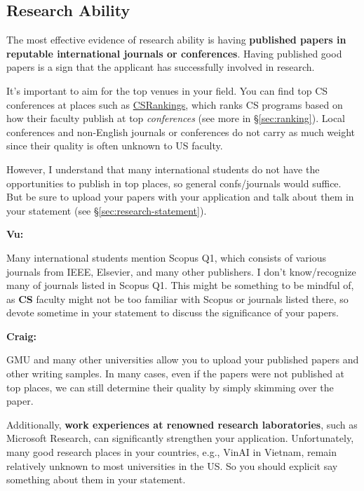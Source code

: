 \documentclass[11pt]{article}
\newenvironment{commentbox}[1][]{
\small
    \begin{cbox}
    \textbf{#1} 
 }{
   \end{cbox}
}
\begin{document}
\subsection{Research Ability}

The most effective evidence of research ability is having \textbf{published papers in reputable international journals or conferences}.
Having published good papers is a sign that the applicant has successfully involved in research.

It's important to aim for the top venues in your field. You can
find top CS conferences at places such as \href{https://csrankings.org}{CSRankings}, which ranks CS programs based on how their faculty publish at top \emph{conferences} (see more in \S\ref{sec:ranking}). Local conferences and non-English journals or conferences do
not carry as much weight since their quality is often unknown to US faculty.


However, I understand that many international students do not have the opportunities to publish in top places, so general confs/journals would suffice.  But be sure to upload your papers with your application and talk about them in your statement (see \S\ref{sec:research-statement}).

\begin{commentbox}[Vu:]
Many international students mention Scopus Q1, which consists of various journals from IEEE, Elsevier, and many other publishers.  I don't know/recognize many of journals listed in Scopus Q1. This might be something to be mindful of, as \textbf{CS} faculty might not be too familiar with Scopus or journals listed there, so devote sometime in your statement to discuss the significance of your papers.
\end{commentbox}

\begin{commentbox}[Craig:]
GMU and many other universities allow you to upload your published papers and other writing samples. In many cases, even if the papers were not published at top places, we can still determine their quality by simply skimming over the paper.  
\end{commentbox}

Additionally, \textbf{work experiences at renowned research laboratories}, such as Microsoft Research, can significantly strengthen your
application.  Unfortunately, many good research places in your countries, e.g., VinAI in Vietnam, remain relatively unknown to most universities in the US. So you should explicit say something about them in your statement.
\end{document}

